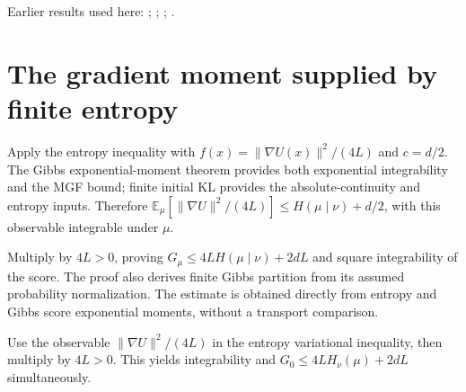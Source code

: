 \documentclass[11pt,a4paper]{article}
\begin{document}
Earlier results used here: \cite[Section~3.26.2]{LangevinLean2026ULASC}; \cite[Section~3.26.3]{LangevinLean2026ULASC}; \cite[Section~3.26.9]{LangevinLean2026ULASC}; \cite[Section~3.27.2]{LangevinLean2026ULASC}.

\section{\texorpdfstring{The gradient moment supplied by finite entropy}{The gradient moment supplied by finite entropy}}


Apply the entropy inequality with \(f(x)=\|\nabla U(x)\|^2/(4L)\) and \(c=d/2\). The Gibbs exponential-moment theorem provides both exponential integrability and the MGF bound; finite initial KL provides the absolute-continuity and entropy inputs. Therefore \(\mathbb E_\mu[\|\nabla U\|^2/(4L)]\le H(\mu\mid\nu)+d/2\), with this observable integrable under \(\mu\).



Multiply by \(4L>0\), proving \(G_\mu\le4L H(\mu\mid\nu)+2dL\) and square integrability of the score. The proof also derives finite Gibbs partition from its assumed probability normalization. The estimate is obtained directly from entropy and Gibbs score exponential moments, without a transport comparison.



Use the observable \(\|\nabla U\|^2/(4L)\) in the entropy variational inequality, then multiply by \(4L>0\). This yields integrability and \(G_0\le4LH_\nu(\mu)+2dL\) simultaneously.
\end{document}

